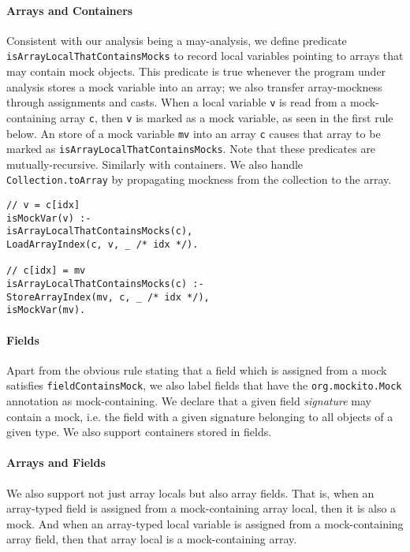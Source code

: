 \paragraph{Arrays and Containers} Consistent with our analysis being a may-analysis, we define predicate {\tt isArrayLocalThatContainsMocks} to record local variables pointing to arrays that may contain mock objects. This predicate is true whenever the program under analysis stores a mock variable into an array; we also transfer array-mockness through assignments and casts. When a local variable \texttt{v} is read from a mock-containing array \texttt{c}, then \texttt{v} is marked as a mock variable, as seen in the first rule below. An store of a mock variable \texttt{mv} into an array \texttt{c} causes that array to be marked as \texttt{isArrayLocalThatContainsMocks}. Note that these predicates are mutually-recursive. Similarly with containers. We also handle {\tt Collection.toArray} by propagating mockness from the collection to the array.

\begin{lstlisting}[basicstyle=\ttfamily\small,numbers=none]
// v = c[idx]
isMockVar(v) :-
isArrayLocalThatContainsMocks(c),
LoadArrayIndex(c, v, _ /* idx */).

// c[idx] = mv
isArrayLocalThatContainsMocks(c) :-
StoreArrayIndex(mv, c, _ /* idx */),
isMockVar(mv).
\end{lstlisting}

\paragraph{Fields} Apart from the obvious rule stating that a field which is assigned from a mock satisfies {\tt fieldContainsMock}, we also label fields that have the {\tt org.mockito.Mock} annotation as mock-containing. We declare that a given field \emph{signature} may contain a mock, i.e. the field with a given signature belonging to all objects of a given type. We also support containers stored in fields.

\paragraph{Arrays and Fields} We also support not just array locals but also array fields. That is, when an array-typed field is assigned from a mock-containing array local, then it is also a mock. And when an array-typed local variable is assigned from a mock-containing array field, then that array local is a mock-containing array.

